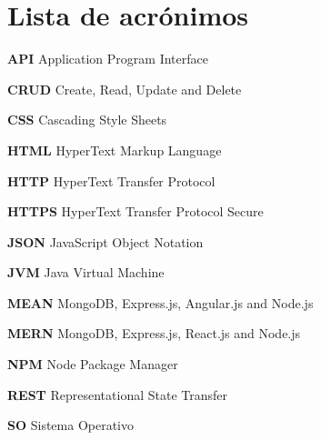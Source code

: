 \section*{Lista de acrónimos}

\noindent \textbf{API} Application Program Interface \newline \smallskip 

\noindent \textbf{CRUD} Create, Read, Update and Delete \newline \smallskip

\noindent \textbf{CSS} Cascading Style Sheets \newline \smallskip

\noindent \textbf{HTML} HyperText Markup Language \newline \smallskip

\noindent \textbf{HTTP} HyperText Transfer Protocol \newline \smallskip

\noindent \textbf{HTTPS} HyperText Transfer Protocol Secure \newline \smallskip

\noindent \textbf{JSON} JavaScript Object Notation \newline \smallskip

\noindent \textbf{JVM} Java Virtual Machine \newline \smallskip

\noindent \textbf{MEAN} MongoDB, Express.js, Angular.js and Node.js \newline \smallskip 

\noindent \textbf{MERN} MongoDB, Express.js, React.js and Node.js \newline \smallskip

\noindent \textbf{NPM} Node Package Manager \newline \smallskip

\noindent \textbf{REST} Representational State Transfer \newline \smallskip

\noindent \textbf{SO} Sistema Operativo \newline \smallskip
